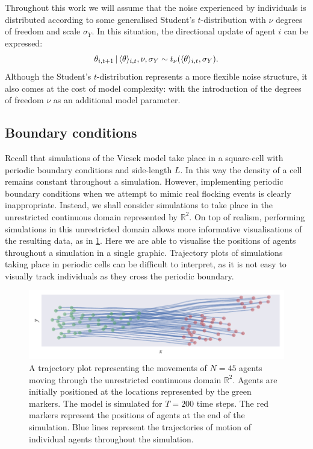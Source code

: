 Throughout this work we will assume that the noise experienced by individuals
is distributed according to some generalised Student's $t$-distribution with
$\nu$ degrees of freedom and scale $\sigma_Y$. In this situation, the
directional update of agent $i$ can be expressed:
\begin{equation}
  \label{eq:students_update}
  \theta_{i,t+1} \,|\, \langle\theta\rangle_{i,t}, \nu, \sigma_Y \sim
     t_{\nu}(\langle\theta\rangle_{i,t}, \sigma_Y).
\end{equation}
Although the Student's $t$-distribution represents a more flexible noise
structure, it also comes at the cost of model complexity: with the introduction
of the degrees of freedom $\nu$ as an additional model parameter.

\subsection{Boundary conditions}

Recall that simulations of the Vicsek model take place in a square-cell with
periodic boundary conditions and side-length $L$. In this way the density of a
cell remains constant throughout a simulation. However, implementing periodic
boundary conditions when we attempt to mimic real flocking events is clearly
inappropriate. Instead, we shall consider simulations to take place in the
unrestricted continuous domain represented by $\mathbb{R}^2$. On top of
realism, performing simulations in this unrestricted domain allows more
informative visualisations of the resulting data, as in
\cref{fig:example_traj}. Here we are able to visualise the positions of agents
throughout a simulation in a single graphic. Trajectory plots of simulations
taking place in periodic cells can be difficult to interpret, as it is not easy
to visually track individuals as they cross the periodic boundary.

\begin{figure}[tb]
  \includegraphics{example_traj_plot.pdf}
  \caption{A trajectory plot representing the movements of $N=45$ agents moving
    through the unrestricted continuous domain $\mathbb{R}^2$. Agents are
    initially positioned at the locations represented by the green markers.
    The model is simulated for $T=200$ time steps. The red markers represent the
    positions of agents at the end of the simulation. Blue lines represent the
    trajectories of motion of individual agents throughout the simulation.}
  \label{fig:example_traj}
\end{figure}

